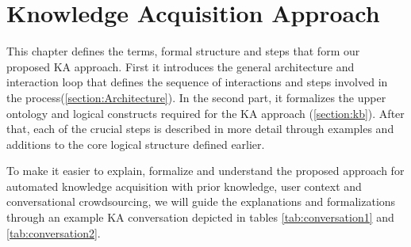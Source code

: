 % 
\chapter{Knowledge Acquisition Approach}
\label{chapter:approach}

This chapter defines the terms, formal structure and steps that form our 
proposed KA approach. First it introduces the general architecture and 
interaction loop that defines the sequence of interactions and steps
involved in the process(\autoref{section:Architecture}). In the second part, it
formalizes the upper ontology and logical constructs required for the KA 
approach (\autoref{section:kb}). After that, each of the crucial steps is 
described in more detail through examples and additions to the core logical 
structure defined earlier.

To make it easier to explain, formalize and understand the proposed approach 
for automated knowledge acquisition with prior knowledge, user context and 
conversational crowdsourcing, we will guide the explanations and formalizations
through an example KA conversation depicted in tables \ref{tab:conversation1}
and \ref{tab:conversation2}.

\newcommand{\step}[1]{\refstepcounter{stepno}\label{#1}}

